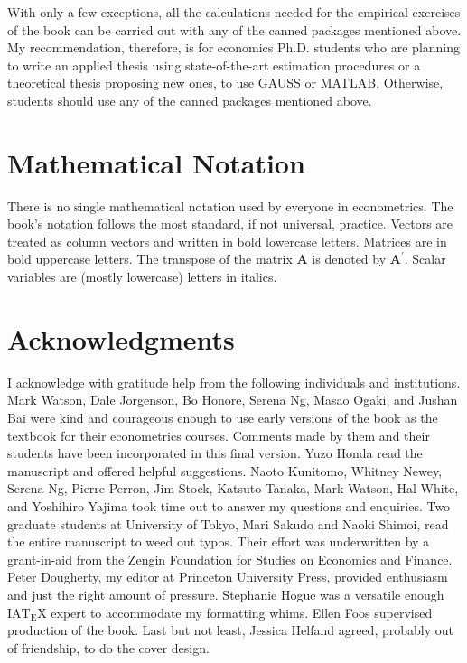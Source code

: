 \documentclass[10pt]{article}
\begin{document}
With only a few exceptions, all the calculations needed for the empirical exercises of the book can be carried out with any of the canned packages mentioned above. My recommendation, therefore, is for economics Ph.D. students who are planning to write an applied thesis using state-of-the-art estimation procedures or a theoretical thesis proposing new ones, to use GAUSS or MATLAB. Otherwise, students should use any of the canned packages mentioned above.

\section*{Mathematical Notation}
There is no single mathematical notation used by everyone in econometrics. The book's notation follows the most standard, if not universal, practice. Vectors are treated as column vectors and written in bold lowercase letters. Matrices are in bold uppercase letters. The transpose of the matrix $\mathbf{A}$ is denoted by $\mathbf{A}^{\prime}$. Scalar variables are (mostly lowercase) letters in italics.

\section*{Acknowledgments}
I acknowledge with gratitude help from the following individuals and institutions. Mark Watson, Dale Jorgenson, Bo Honore, Serena Ng, Masao Ogaki, and Jushan Bai were kind and courageous enough to use early versions of the book as the\\
textbook for their econometrics courses. Comments made by them and their students have been incorporated in this final version. Yuzo Honda read the manuscript and offered helpful suggestions. Naoto Kunitomo, Whitney Newey, Serena Ng, Pierre Perron, Jim Stock, Katsuto Tanaka, Mark Watson, Hal White, and Yoshihiro Yajima took time out to answer my questions and enquiries. Two graduate students at University of Tokyo, Mari Sakudo and Naoki Shimoi, read the entire manuscript to weed out typos. Their effort was underwritten by a grant-in-aid from the Zengin Foundation for Studies on Economics and Finance. Peter Dougherty, my editor at Princeton University Press, provided enthusiasm and just the right amount of pressure. Stephanie Hogue was a versatile enough $\mathrm{IAT}_{\mathrm{E}} \mathrm{X}$ expert to accommodate my formatting whims. Ellen Foos supervised production of the book. Last but not least, Jessica Helfand agreed, probably out of friendship, to do the cover design.
\end{document}
